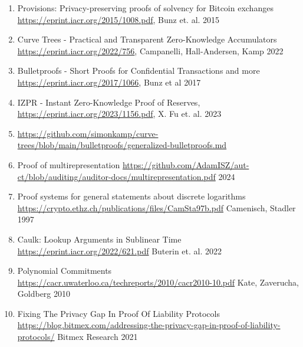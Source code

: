 \documentclass[10pt,a4paper]{article}
\providecommand{\tightlist}{%
  \setlength{\itemsep}{0pt}\setlength{\parskip}{0pt}}
\begin{document}
\begin{enumerate}
\def\labelenumi{\arabic{enumi}.}
\tightlist
\item
  \protect\hypertarget{anchor-1}{}{}Provisions: Privacy-preserving proofs of solvency for Bitcoin exchanges
  \url{https://eprint.iacr.org/2015/1008.pdf}, Bunz et. al. 2015
\item
  \protect\hypertarget{anchor-2}{}{}Curve Trees - Practical and Transparent Zero-Knowledge Accumulators
  \url{https://eprint.iacr.org/2022/756}, Campanelli, Hall-Andersen, Kamp 2022
 \item
  \protect\hypertarget{anchor-3}{}{}Bulletproofs - Short Proofs for Confidential Transactions and more
  \url{https://eprint.iacr.org/2017/1066}, Bunz et al 2017
\item
  \protect\hypertarget{anchor-4}{}{}IZPR - Instant Zero-Knowledge Proof of Reserves,
  \url{https://eprint.iacr.org/2023/1156.pdf}, X. Fu et. al. 2023
 \item
 \protect\hypertarget{anchor-5}{}{} \url{https://github.com/simonkamp/curve-trees/blob/main/bulletproofs/generalized-bulletproofs.md}
\item
  \protect\hypertarget{anchor-6}{}{} Proof of multirepresentation
  \url{https://github.com/AdamISZ/aut-ct/blob/auditing/auditor-docs/multirepresentation.pdf} 2024
\item
  \protect\hypertarget{anchor-7}{}{} Proof systems for general statements about discrete logarithms
  \url{https://crypto.ethz.ch/publications/files/CamSta97b.pdf} Camenisch, Stadler 1997
 \item
  \protect\hypertarget{anchor-8}{}{} Caulk: Lookup Arguments in Sublinear Time
  \url{https://eprint.iacr.org/2022/621.pdf} Buterin et. al. 2022
 \item
 \protect\hypertarget{anchor-9}{}{} Polynomial Commitments
 \url{https://cacr.uwaterloo.ca/techreports/2010/cacr2010-10.pdf} Kate, Zaverucha, Goldberg 2010
 \item
 \protect\hypertarget{anchor-10}{}{} Fixing The Privacy Gap In Proof Of Liability Protocols \url{https://blog.bitmex.com/addressing-the-privacy-gap-in-proof-of-liability-protocols/} Bitmex Research 2021
\end{enumerate}
\end{document}
